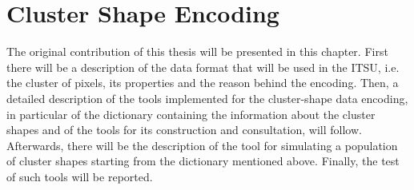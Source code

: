 \chapter{Cluster Shape Encoding}
The original contribution of this thesis will be presented in this chapter. First there will be a description of the data format that will be used in the ITSU, i.e. the cluster of pixels, its properties and the reason behind the encoding. Then, a detailed description of the tools implemented for the cluster-shape data encoding, in particular of the dictionary containing the information about the cluster shapes and of the tools for its construction and consultation, will follow. Afterwards, there will be the description of the tool for simulating a population of cluster shapes starting from the dictionary mentioned above. Finally, the test of such tools will be reported.
